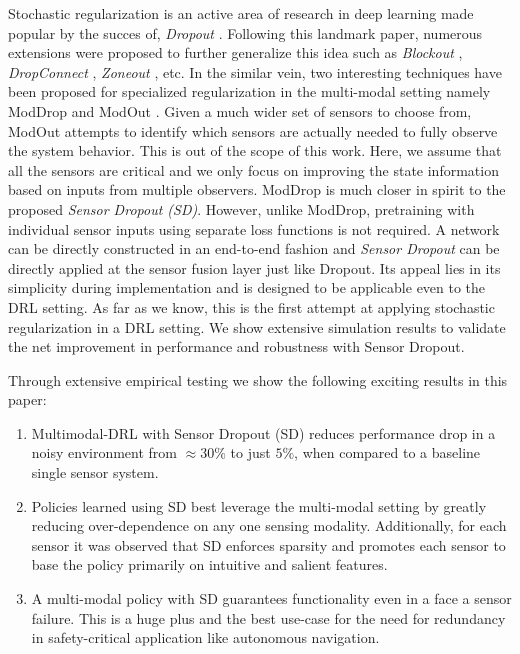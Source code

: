 \documentclass[../thesis.tex]{subfiles}
\begin{document}
Stochastic regularization is an active area of research in deep learning made popular by the succes of, \textit{Dropout} \cite{dropout}. Following this landmark paper, numerous extensions were proposed  to further generalize this idea such as \textit{Blockout} \cite{blockout}, \textit{DropConnect} \cite{dropconnect}, \textit{Zoneout} \cite{zoneout}, etc. In the similar vein, two interesting techniques have been proposed for specialized regularization in the multi-modal setting namely ModDrop \cite{moddrop} and ModOut \cite{modout}. Given a much wider set of sensors to choose from, ModOut attempts to identify which sensors are actually needed to fully observe the system behavior. This is out of the scope of this work. Here, we assume that all the sensors are critical and we only focus on improving the state information based on inputs from multiple observers. ModDrop is much closer in spirit to the proposed \emph{Sensor Dropout (SD)}. However, unlike ModDrop, pretraining with individual sensor inputs using separate loss functions is not required. A network can be directly constructed in an end-to-end fashion and \emph{Sensor Dropout} can be directly applied at the sensor fusion layer just like Dropout. Its appeal lies in its simplicity during implementation and is designed to be applicable even to the DRL setting. As far as we know, this is the first attempt at applying stochastic regularization in a DRL setting. We show extensive simulation results to validate the net improvement in performance and robustness with Sensor Dropout. 

Through extensive empirical testing we show the following exciting results in this paper:
\begin{enumerate}
\item Multimodal-DRL with Sensor Dropout (SD) reduces performance drop in a noisy environment from $\approx 30\%$ to just $5\%$, when compared to a baseline single sensor system.
\item Policies learned using SD best leverage the multi-modal setting by greatly reducing over-dependence on any one sensing modality. Additionally, for each sensor it was observed that SD enforces sparsity and promotes each sensor to base the policy primarily on intuitive and salient features.
\item A multi-modal policy with SD guarantees functionality even in a face a sensor failure. This is a huge plus and the best use-case for the need for redundancy in safety-critical application like autonomous navigation.
\end{enumerate}
\end{document}
